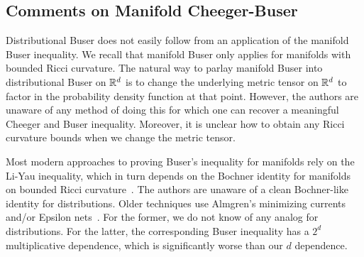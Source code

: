 \subsection{Comments on Manifold Cheeger-Buser}
Distributional Buser does not easily follow from an
application of
the manifold Buser inequality. We recall that manifold Buser only applies for
    manifolds with bounded Ricci curvature. The natural way to parlay manifold Buser into
distributional Buser on $\mathbb{R}^d$ is to change the underlying metric tensor
on $\mathbb{R}^d$ to factor in the probability density function at that
point. However, the authors are unaware of any method of doing
this for which one can recover a meaningful Cheeger and
Buser inequality. Moreover, it is unclear how to obtain any Ricci
curvature bounds when we change the metric tensor.

Most modern approaches to proving Buser's inequality for
    manifolds rely on the
Li-Yau inequality, which in turn depends on the Bochner identity
    for manifolds on bounded Ricci
    curvature~\cite{ledoux2004spectral}.
The authors are unaware of a clean Bochner-like identity for
distributions. Older techniques use Almgren's minimizing currents
and/or Epsilon nets~\cite{Buser82}. For the former, we do not know of any
analog for distributions. For the latter, the corresponding
Buser inequality has a $2^{d}$ multiplicative dependence, which
is significantly worse than our $d$ dependence.
